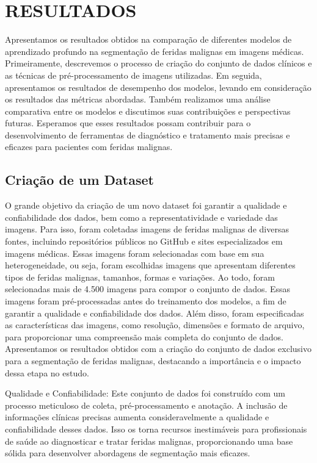 \section{RESULTADOS}

Apresentamos os resultados obtidos na comparação de diferentes modelos de aprendizado profundo na segmentação de feridas malignas em imagens médicas. Primeiramente, descrevemos o processo de criação do conjunto de dados clínicos e as técnicas de pré-processamento de imagens utilizadas. Em seguida, apresentamos os resultados de desempenho dos modelos, levando em consideração os resultados das métricas abordadas. Também realizamos uma análise comparativa entre os modelos e discutimos suas contribuições e perspectivas futuras. Esperamos que esses resultados possam contribuir para o desenvolvimento de ferramentas de diagnóstico e tratamento mais precisas e eficazes para pacientes com feridas malignas.

\subsection{Criação de um Dataset}

     O grande objetivo da criação de um novo dataset foi garantir a qualidade e confiabilidade dos dados, bem como a representatividade e variedade das imagens. Para isso, foram coletadas imagens de feridas malignas de diversas fontes, incluindo repositórios públicos no GitHub e sites especializados em imagens médicas. Essas imagens foram selecionadas com base em sua heterogeneidade, ou seja, foram escolhidas imagens que apresentam diferentes tipos de feridas malignas, tamanhos, formas e variações. Ao todo, foram selecionadas mais de 4.500 imagens para compor o conjunto de dados. Essas imagens foram pré-processadas antes do treinamento dos modelos, a fim de garantir a qualidade e confiabilidade dos dados. Além disso, foram especificadas as características das imagens, como resolução, dimensões e formato de arquivo, para proporcionar uma compreensão mais completa do conjunto de dados. Apresentamos os resultados obtidos com a criação do conjunto de dados exclusivo para a segmentação de feridas malignas, destacando a importância e o impacto dessa etapa no estudo.
    
    Qualidade e Confiabilidade: Este conjunto de dados foi construído com um processo meticuloso de coleta, pré-processamento e anotação. A inclusão de informações clínicas precisas aumenta consideravelmente a qualidade e confiabilidade desses dados. Isso os torna recursos inestimáveis para profissionais de saúde ao diagnosticar e tratar feridas malignas, proporcionando uma base sólida para desenvolver abordagens de segmentação mais eficazes.
    
